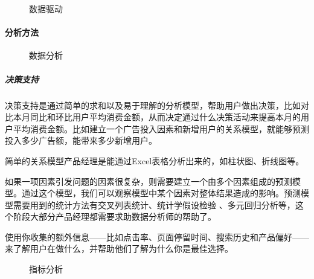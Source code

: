 \documentclass[letterpaper,10pt,english]{sphinxmanual}
\begin{document}
\begin{figure}[H]
\centering
\capstart

\noindent{}
\caption{数据驱动}\label{\detokenize{chapter_knowledge/data_analysis:id20}}\end{figure}


\paragraph{分析方法}
\label{\detokenize{chapter_knowledge/data_analysis:id5}}
\begin{figure}[H]
\centering
\capstart

\noindent{}
\caption{数据分析}\label{\detokenize{chapter_knowledge/data_analysis:id21}}\end{figure}


\subparagraph{决策支持}
\label{\detokenize{chapter_knowledge/data_analysis:id6}}
决策支持是通过简单的求和以及易于理解的分析模型，帮助用户做出决策，比如对比本月同比和环比用户平均消费金额，从而决定通过什么决策活动来提高本月的用户平均消费金额。比如建立一个广告投入因素和新增用户的关系模型，就能够预测投入多少广告额，能带来多少新增用户。

简单的关系模型产品经理是能通过Excel表格分析出来的，如柱状图、折线图等。

如果一项因素引发问题的因素很复杂，则需要建立一个由多个因素组成的预测模型。通过这个模型，我们可以观察模型中某个因素对整体结果造成的影响。预测模型需要用到的统计方法有交叉列表统计、统计学假设检验
、多元回归分析等，这个阶段大部分产品经理都需要求助数据分析师的帮助了。

使用你收集的额外信息——比如点击率、页面停留时间、搜索历史和产品偏好——来了解用户在做什么，并帮助他们了解为什么你是最佳选择。
%
\begin{footnote}[666]\sphinxAtStartFootnote
{}
%
\end{footnote}

\begin{figure}[H]
\centering
\capstart

\noindent{}
\caption{指标分析\sphinxfootnotemark[667]}\label{\detokenize{chapter_knowledge/data_analysis:id22}}\end{figure}
%
\begin{footnotetext}[667]\sphinxAtStartFootnote
{}
%
\end{footnotetext}\ignorespaces 
\end{document}
